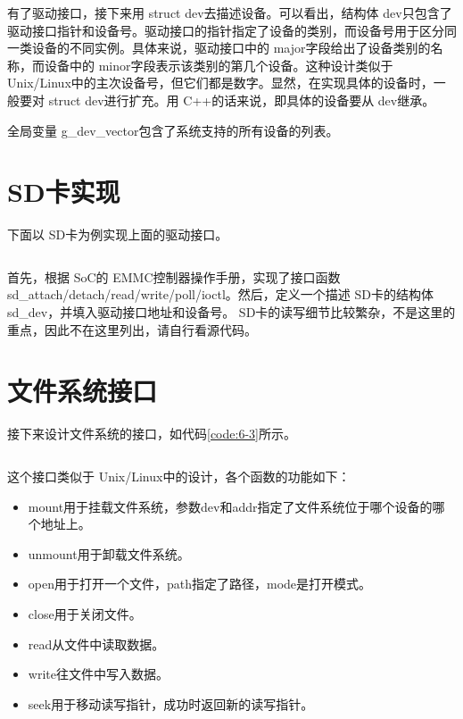 \documentclass[main.tex]{subfiles}
\begin{document}
\begin{CJK*}{UTF8}{song}
有了驱动接口，接下来用 struct dev去描述设备。可以看出，结构体 dev只包含了驱动接口指针和设备号。驱动接口的指针指定了设备的类别，而设备号用于区分同一类设备的不同实例。具体来说，驱动接口中的 major字段给出了设备类别的名称，而设备中的 minor字段表示该类别的第几个设备。这种设计类似于 Unix/Linux中的主次设备号，但它们都是数字。显然，在实现具体的设备时，一般要对 struct dev进行扩充。用 C++的话来说，即具体的设备要从 dev继承。

\par
全局变量 g\_dev\_vector包含了系统支持的所有设备的列表。

\section{SD卡实现}
下面以 SD卡为例实现上面的驱动接口。

\begin{code}
\label{code:6-2}
\inputminted[firstline=1737,lastline=1754,linenos,numbersep=5pt,frame=lines,framesep=2mm]{c}{src/chapter06/kernel/sdcard.c}
\end{code}

首先，根据 SoC的 EMMC控制器操作手册，实现了接口函数 sd\_\-attach/\-detach/\-read/\-write/\-poll/\-ioctl。然后，定义一个描述 SD卡的结构体 sd\_dev，并填入驱动接口地址和设备号。 SD卡的读写细节比较繁杂，不是这里的重点，因此不在这里列出，请自行看源代码。

\section{文件系统接口}
接下来设计文件系统的接口，如代码\ref{code:6-3}所示。

\begin{code}
\label{code:6-3}
\inputminted[firstline=159,lastline=189,linenos,numbersep=5pt,frame=lines,framesep=2mm]{c}{src/chapter06/kernel/kernel.h}
\end{code}

\noindent
这个接口类似于 Unix/Linux中的设计，各个函数的功能如下：

\begin{itemize}
\item mount用于挂载文件系统，参数dev和addr指定了文件系统位于哪个设备的哪个地址上。
\item unmount用于卸载文件系统。
\item open用于打开一个文件，path指定了路径，mode是打开模式。
\item close用于关闭文件。
\item read从文件中读取数据。
\item write往文件中写入数据。
\item seek用于移动读写指针，成功时返回新的读写指针。
\end{itemize}


\end{CJK*}
\end{document}
